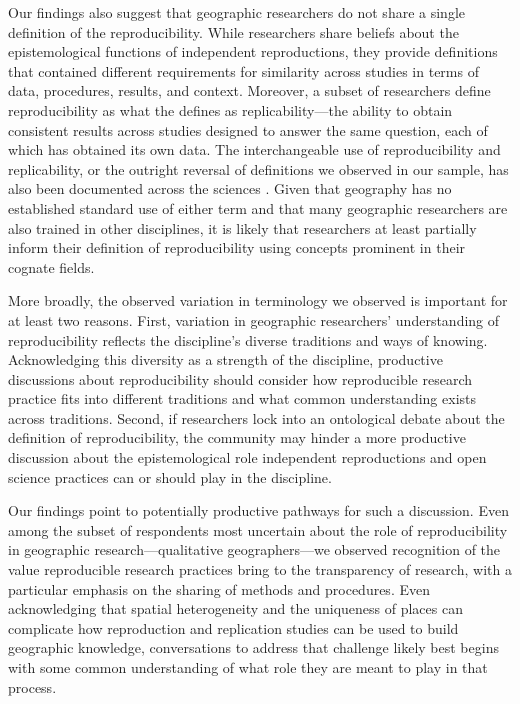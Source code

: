 \documentclass[]{interact}
\theoremstyle{plain}%
\theoremstyle{definition}
\theoremstyle{remark}
\begin{document}
Our findings also suggest that geographic researchers do not share a single definition of the reproducibility. 
While researchers share beliefs about the epistemological functions of independent reproductions, they provide definitions that contained different requirements for similarity across studies in terms of data, procedures, results, and context.  
Moreover, a subset of researchers define reproducibility as what the \citet{NASEM2019} defines as replicability---the ability to obtain consistent results across studies designed to answer the same question, each of which has obtained its own data.
The interchangeable use of reproducibility and replicability, or the outright reversal of definitions we observed in our sample, has also been documented across the sciences \citep{barba2018terminologies, plesser2018reproducibility}. 
Given that geography has no established standard use of either term and that many geographic researchers are also trained in other disciplines, it is likely that researchers at least partially inform their definition of reproducibility using concepts prominent in their cognate fields.

More broadly, the observed variation in terminology we observed is important for at least two reasons. 
First, variation in geographic researchers' understanding of reproducibility reflects the discipline's diverse traditions and ways of knowing. 
Acknowledging this diversity as a strength of the discipline, productive discussions about reproducibility should consider how reproducible research practice fits into different traditions and what common understanding exists across traditions. 
Second, if researchers lock into an ontological debate about the definition of reproducibility, the community may hinder a more productive discussion about the epistemological role independent reproductions and open science practices can or should play in the discipline. 

Our findings point to potentially productive pathways for such a discussion. 
Even among the subset of respondents most uncertain about the role of reproducibility in geographic research---qualitative geographers---we observed recognition of the value reproducible research practices bring to the transparency of research, with a particular emphasis on the sharing of methods and procedures.   
Even acknowledging that spatial heterogeneity and the uniqueness of places can complicate how reproduction and replication studies can be used to build geographic knowledge, conversations to address that challenge likely best begins with some common understanding of what role they are meant to play in that process.  
\end{document}
